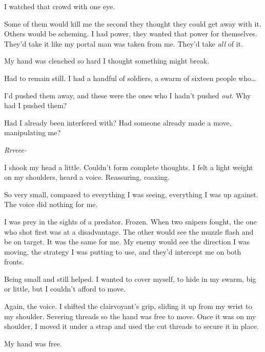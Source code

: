 I watched that crowd with one eye.



Some of them would kill me the second they thought they could get away with it.  Others would be scheming.  I had power, they wanted that power for themselves.  They'd take it like my portal man was taken from me.  They'd take \emph{all} of it.



My hand was clenched so hard I thought something might break.



Had to remain still.  I had a handful of soldiers, a swarm of sixteen people who\ldots



I'd pushed them away, and these were the ones who I hadn't pushed \emph{out}.  Why had I pushed them?



Had I already been interfered with?  Had someone already made a move, manipulating me?



\emph{Rrreee-}



I shook my head a little.  Couldn't form complete thoughts.  I felt a light weight on my shoulders, heard a voice.  Reassuring, coaxing.



So very small, compared to everything I was seeing, everything I was up against.  The voice did nothing for me.



I was prey in the sights of a predator.  Frozen.  When two snipers fought, the one who shot first was at a disadvantage.  The other would see the muzzle flash and be on target.  It was the same for me.  My enemy would see the direction I was moving, the strategy I was putting to use, and they'd intercept me on both fronts.



Being small and still helped.  I wanted to cover myself, to hide in my swarm, big or little, but I couldn't afford to move.



Again, the voice.  I shifted the clairvoyant's grip, sliding it up from my wrist to my shoulder.  Severing threads so the hand was free to move.  Once it was on my shoulder, I moved it under a strap and used the cut threads to secure it in place.



My hand was free.




